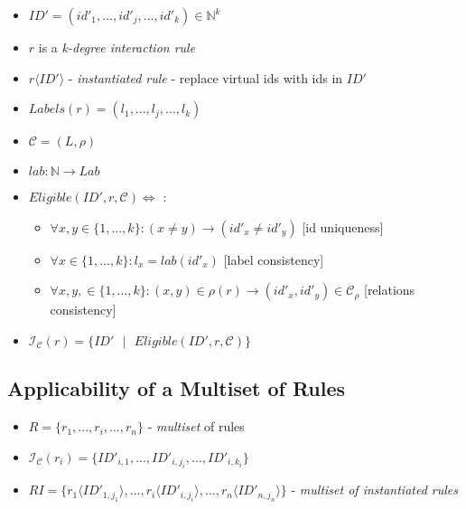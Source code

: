 \documentclass{article}
\newcommand{\s}{\text{ }}
\begin{document}
\begin{enumerate}
\begin{itemize}
\item $ID' = (id'_1,...,id'_j,...,id'_k) \in \mathbb{N}^k$ 
\item $r$ is a \textit{k-degree interaction rule}
\item $r \langle ID'\rangle$ - \textit{instantiated rule} - replace virtual ids with ids in $ID'$
\item $Labels(r) = (l_1,...,l_j,...,l_k)$
\item $\mathcal{C} = (L,\rho)$
\item $lab: \mathbb{N} \rightarrow Lab$
\item $Eligible(ID',r,\mathcal{C}) \Leftrightarrow$ :
\begin{itemize}
\item $\forall x,y  \in \{1,...,k\}: (x \neq y) \rightarrow (id'_x \neq id'_y)$ [id uniqueness]
\item $\forall x    \in \{1,...,k\}: l_x = lab(id'_x)$  [label consistency]
\item $\forall x,y, \in \{1,...,k\}: (x,y) \in \rho(r) \rightarrow (id'_x, id'_y) 
                                                 \in \mathcal{C}_{\rho}$ [relations consistency]
\end{itemize}
\item $\mathcal{I}_{\mathcal{C}} (r) = \{ID' \s|\s Eligible(ID',r, \mathcal{C})\}$
\end{itemize}


\end{enumerate}


\subsection{Applicability of a Multiset of Rules}


\begin{itemize}
\item $R = \{r_1,...,r_i,...,r_n\}$ - \textit{multiset} of rules
\item $\mathcal{I}_{\mathcal{C}}(r_i) = \{ID'_{i,1},...,ID'_{i,j_i},...,ID'_{i,k_i}\}$
\item $RI = \{r_1\langle ID'_{1,j_1}\rangle,...,r_i\langle ID'_{i,j_i}\rangle,...,
            r_n\langle ID'_{n,j_n}\rangle\}$ - \textit{multiset of instantiated rules}
\end{itemize}
\end{document}
